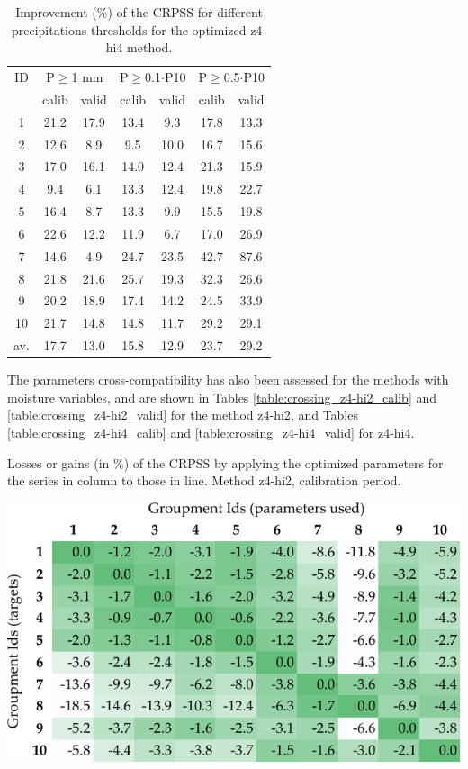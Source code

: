 \documentclass[5p]{elsarticle}
\begin{document}
\begin{table}[htbp]
	\caption{Improvement (\%) of the CRPSS for different precipitations thresholds for the optimized z4-hi4 method.}
	\footnotesize
	\begin{center}
		\begin{tabular}{ccccccc}
			\hline 
			ID & \multicolumn{2}{c}{P\(\geq\)1 mm} & \multicolumn{2}{c}{P\(\geq\)0.1\(\cdot\)P10} & \multicolumn{2}{c}{P\(\geq\)0.5\(\cdot\)P10} \\ 
			& calib & valid & calib & valid & calib & valid \\ 
			\hline 
			1 & 21.2 & 17.9 & 13.4 & 9.3 & 17.8 & 13.3 \\ 
			2 & 12.6 & 8.9 & 9.5 & 10.0 & 16.7 & 15.6 \\ 
			3 & 17.0 & 16.1 & 14.0 & 12.4 & 21.3 & 15.9 \\ 
			4 & 9.4 & 6.1 & 13.3 & 12.4 & 19.8 & 22.7 \\ 
			5 & 16.4 & 8.7 & 13.3 & 9.9 & 15.5 & 19.8 \\ 
			6 & 22.6 & 12.2 & 11.9 & 6.7 & 17.0 & 26.9 \\ 
			7 & 14.6 & 4.9 & 24.7 & 23.5 & 42.7 & 87.6 \\ 
			8 & 21.8 & 21.6 & 25.7 & 19.3 & 32.3 & 26.6 \\ 
			9 & 20.2 & 18.9 & 17.4 & 14.2 & 24.5 & 33.9 \\ 
			10 & 21.7 & 14.8 & 14.8 & 11.7 & 29.2 & 29.1 \\ 
			\hline 
			av. & 17.7 & 13.0 & 15.8 & 12.9 & 23.7 & 29.2 \\ 
			\hline 
		\end{tabular} 
	\end{center}
	\label{table:scores_thresholds_z4-hi4}
\end{table}

The parameters cross-compatibility has also been assessed for the methods with moisture variables, and are shown in Tables \ref{table:crossing_z4-hi2_calib} and \ref{table:crossing_z4-hi2_valid} for the method z4-hi2, and Tables \ref{table:crossing_z4-hi4_calib} and \ref{table:crossing_z4-hi4_valid} for z4-hi4.


\begin{table}[htb]
	\caption{Losses or gains (in \%) of the CRPSS by applying the optimized parameters for the series in column to those in line. Method z4-hi2, calibration period.}
	\centerline{\includegraphics[width=\linewidth]{figures/table_crossing_z4-hi2_calib.pdf}}
	\label{table:crossing_z4-hi2_calib}
\end{table}
\end{document}
